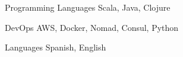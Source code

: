 


\begin{cvskills}






\cvskill
{Programming Languages} %
{Scala, Java, Clojure} %




\cvskill
{DevOps} %
{AWS, Docker, Nomad, Consul, Python} %


\cvskill
{Languages} %
{Spanish, English} %




\end{cvskills}
